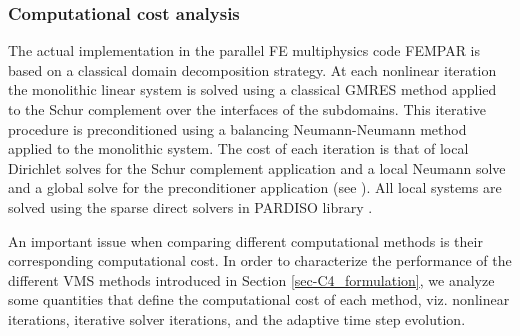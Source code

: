 
\subsubsection{Computational cost analysis}

\label{subsubsec-C4_comp_cost_DHIT}
The actual implementation in the parallel FE multiphysics code FEMPAR \cite{Badia2013a} is based on a classical domain decomposition strategy. At each nonlinear iteration the monolithic linear system is solved using a classical GMRES method applied to the Schur complement over the interfaces of the subdomains. This iterative procedure is preconditioned using a balancing Neumann-Neumann method applied to the monolithic system. The cost of each iteration is that of local Dirichlet solves for the Schur complement application and a local Neumann solve and a global solve for the preconditioner application (see \cite{mandel_balancing_1993,dohrmann_preconditioner_2003,Badia2013}). All local systems are solved using the sparse direct solvers in PARDISO library \cite{Schenk2004,Schenk2006}.

An important issue when comparing different computational methods is their corresponding computational cost. In order to characterize the performance of the different VMS methods introduced in Section \ref{sec-C4_formulation},  we analyze  some quantities that define the computational cost of each method, viz. nonlinear iterations, iterative solver iterations, and the adaptive time step evolution.


